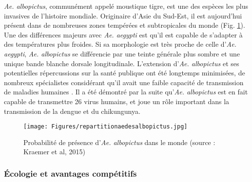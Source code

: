 {\em Ae. albopictus}, communément appelé \guillemotleft moustique tigre\guillemotright \;, est une des espèces les plus invasives de l'histoire mondiale. 
Originaire d'Asie du Sud-Est, il est aujourd'hui présent dans de nombreuses zones tempérées et subtropicales du monde (Fig. \ref{fig:repartitionaedesalbopictus}). 
Une des différences majeurs avec {\em Ae. aegypti} est qu'il est capable de s'adapter à des températures plus froides.
Si sa morphologie est très proche de celle d'{\em Ae. aegypti}, {\em Ae. albopictus} se différencie par une teinte générale plus sombre et une unique bande blanche dorsale longitudinale.
L'extension d'{\em Ae. albopictus} et ses potentielles répercussions sur la santé publique ont été longtemps minimisées, de nombreux spécialistes considérant qu'il avait une faible capacité de transmission de maladies humaines \cite{paupy2009aedes}. 
Il a été démontré par la suite qu'{\em Ae. albopictus} est en fait capable de transmettre 26 virus humains, et joue un rôle important dans la transmission de la dengue et du chikungunya.


\begin{figure}[t]
	\centering
	\texttt{[image: Figures/repartitionaedesalbopictus.jpg]}
	\caption{Probabilité de présence d'{\em Ae. albopictus} dans le monde (source : Kraemer et al, 2015)}
	\label{fig:repartitionaedesalbopictus}
\end{figure}


\subsubsection{Écologie et avantages compétitifs}

